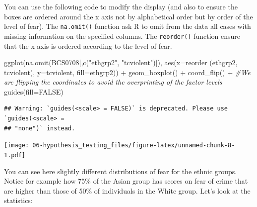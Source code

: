 \documentclass[
]{book}
\newenvironment{Shaded}{\begin{snugshade}}{\end{snugshade}}
\newcommand{\AttributeTok}[1]{\textcolor[rgb]{0.77,0.63,0.00}{#1}}
\newcommand{\CommentTok}[1]{\textcolor[rgb]{0.56,0.35,0.01}{\textit{#1}}}
\newcommand{\ConstantTok}[1]{\textcolor[rgb]{0.00,0.00,0.00}{#1}}
\newcommand{\FunctionTok}[1]{\textcolor[rgb]{0.00,0.00,0.00}{#1}}
\newcommand{\NormalTok}[1]{#1}
\newcommand{\SpecialCharTok}[1]{\textcolor[rgb]{0.00,0.00,0.00}{#1}}
\newcommand{\StringTok}[1]{\textcolor[rgb]{0.31,0.60,0.02}{#1}}
\begin{document}
You can use the following code to modify the display (and also to ensure the boxes are ordered around the x axis not by alphabetical order but by order of the level of fear). The \texttt{na.omit()} function ask R to omit from the data all cases with missing information on the specified columns. The \texttt{reorder()} function ensure that the x axis is ordered according to the level of fear.

\begin{Shaded}
\begin{Highlighting}[]
\FunctionTok{ggplot}\NormalTok{(}\FunctionTok{na.omit}\NormalTok{(BCS0708[,}\FunctionTok{c}\NormalTok{(}\StringTok{"ethgrp2"}\NormalTok{, }\StringTok{"tcviolent"}\NormalTok{)]), }\FunctionTok{aes}\NormalTok{(}\AttributeTok{x=}\FunctionTok{reorder}\NormalTok{ (ethgrp2, tcviolent), }\AttributeTok{y=}\NormalTok{tcviolent, }\AttributeTok{fill=}\NormalTok{ethgrp2)) }\SpecialCharTok{+}
  \FunctionTok{geom\_boxplot}\NormalTok{() }\SpecialCharTok{+}
  \FunctionTok{coord\_flip}\NormalTok{() }\SpecialCharTok{+} \CommentTok{\#We are flipping the coordinates to avoid the overprinting of the factor levels}
  \FunctionTok{guides}\NormalTok{(}\AttributeTok{fill=}\ConstantTok{FALSE}\NormalTok{)}
\end{Highlighting}
\end{Shaded}

\begin{verbatim}
## Warning: `guides(<scale> = FALSE)` is deprecated. Please use `guides(<scale> =
## "none")` instead.
\end{verbatim}

\texttt{[image: 06-hypothesis\_testing\_files/figure-latex/unnamed-chunk-8-1.pdf]}

You can see here slightly different distributions of fear for the ethnic groups. Notice for example how 75\% of the Asian group has scores on fear of crime that are higher than those of 50\% of individuals in the White group. Let's look at the statistics:

\begin{Shaded}
\end{Shaded}
\end{document}
